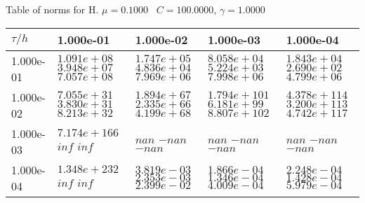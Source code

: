 \begin{center}
Table of norms for H. $\mu = 0.1000$ \, $C = 100.0000$, $\gamma = 1.0000$
  
\begin{tabular}{|p{1in}|p{1in}|p{1in}|p{1in}|p{1in}|} \hline
$\tau / h$ &1.000e-01 &1.000e-02 &1.000e-03 &1.000e-04 \\ \hline 
1.000e-01 & $1.091e+08$  $3.948e+07$  $7.057e+08$  & $1.747e+05$  $4.836e+04$  $7.969e+06$  & $8.058e+04$  $5.224e+03$  $7.998e+06$  & $1.843e+04$  $2.690e+02$  $4.799e+06$  \\ \hline 
1.000e-02 & $7.055e+31$  $3.830e+31$  $8.213e+32$  & $1.894e+67$  $2.335e+66$  $4.199e+68$  & $1.794e+101$  $6.181e+99$  $8.807e+102$  & $4.378e+114$  $3.200e+113$  $4.742e+117$  \\ \hline 
1.000e-03 & $7.174e+166$  $inf$  $inf$  & $nan$  $-nan$  $-nan$  & $nan$  $-nan$  $-nan$  & $nan$  $-nan$  $-nan$  \\ \hline 
1.000e-04 & $1.348e+232$  $inf$  $inf$  & $3.819e-03$  $2.353e-03$  $2.399e-02$  & $1.866e-04$  $1.346e-04$  $4.009e-04$  & $2.248e-04$  $1.428e-04$  $5.979e-04$  \\ \hline 

\end{tabular}\\[20pt]
\end{center}
